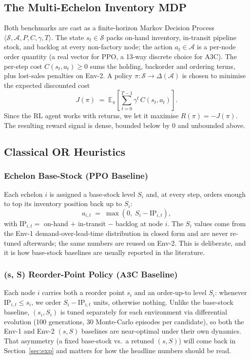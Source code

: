 \documentclass[letterpaper]{article} %
\begin{document}
\subsection{The Multi-Echelon Inventory MDP}
Both benchmarks are cast as a finite-horizon Markov Decision
Process
$\langle\mathcal{S},\mathcal{A},P,C,\gamma,T\rangle$.
The state $s_t\in\mathcal{S}$ packs on-hand inventory, in-transit
pipeline stock, and backlog at every non-factory node; the action
$a_t\in\mathcal{A}$ is a per-node order quantity (a real vector
for PPO, a 13-way discrete choice for A3C).  The per-step cost
$C(s_t,a_t)\ge 0$ sums the holding, backorder and ordering terms,
plus lost-sales penalties on Env-2.  A policy
$\pi:\mathcal{S}\to\Delta(\mathcal{A})$ is chosen to minimise the
expected discounted cost
\begin{equation}
J(\pi) \;=\; \mathbb{E}_\pi\!\left[\sum_{t=0}^{T-1}
             \gamma^{t}\,C(s_t,a_t)\right].
\label{eq:obj}
\end{equation}
Since the RL agent works with returns, we let it maximise
$R(\pi)=-J(\pi)$.  The resulting reward signal is dense, bounded
below by $0$ and unbounded above.

\subsection{Classical OR Heuristics}

\subsubsection{Echelon Base-Stock (PPO Baseline)}
Each echelon $i$ is assigned a base-stock level $S_i$ and, at
every step, orders enough to top its inventory position back up
to $S_i$:
\begin{equation}
a_{i,t} \;=\; \max\!\left(0,\; S_i - \mathrm{IP}_{i,t}\right),
\label{eq:basestock}
\end{equation}
with $\mathrm{IP}_{i,t}=$ on-hand $+$ in-transit $-$ backlog at
node $i$.  The $S_i$ values come from the Env-1
demand-over-lead-time distribution in closed form and are never
re-tuned afterwards; the same numbers are reused on Env-2.  This
is deliberate, and it is how base-stock baselines are usually
reported in the literature.

\subsubsection{(s, S) Reorder-Point Policy (A3C Baseline)}
Each node $i$ carries both a reorder point $s_i$ and an
order-up-to level $S_i$: whenever $\mathrm{IP}_{i,t}\le s_i$, we
order $S_i-\mathrm{IP}_{i,t}$ units, otherwise nothing.  Unlike
the base-stock baseline, $(s_i,S_i)$ is tuned separately for each
environment via differential evolution (100 generations, 30
Monte-Carlo episodes per candidate), so both the Env-1 and Env-2
$(s,S)$ baselines are near-optimal under their own dynamics.
That asymmetry (a fixed base-stock vs.\ a retuned $(s,S)$) will
come back in Section~\ref{sec:exp} and matters for how the
headline numbers should be read.
\end{document}
